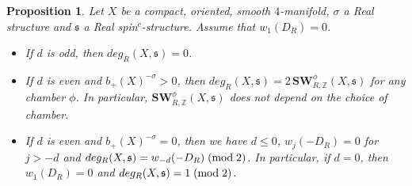\documentclass{amsart}
\newtheorem{proposition}[theorem]{Proposition}
\theoremstyle{definition}
\theoremstyle{remark}
\numberwithin{equation}{section}
\begin{document}
\begin{proposition}\label{prop:deginteger}
Let $X$ be a compact, oriented, smooth $4$-manifold, $\sigma$ a Real structure and $\mathfrak{s}$ a Real spin$^c$-structure. Assume that $w_1(D_R) = 0$.
\begin{itemize}
\item[(1)]{If $d$ is odd, then $deg_R(X,\mathfrak{s}) = 0$.}
\item[(2)]{If $d$ is even and $b_+(X)^{-\sigma}>0$, then $deg_R(X,\mathfrak{s}) = 2 \, \mathbf{SW}^\phi_{R,\mathbb{Z}}(X , \mathfrak{s})$ for any chamber $\phi$. In particular, $\mathbf{SW}^\phi_{R,\mathbb{Z}}(X,\mathfrak{s})$ does not depend on the choice of chamber.}
\item[(3)]{If $d$ is even and $b_+(X)^{-\sigma} = 0$, then we have $d \le 0$, $w_j(-D_R) = 0$ for $j > -d$ and $deg_R(X,\mathfrak{s}) = w_{-d}(-D_R) \; ({\rm mod} \; 2)$. In particular, if $d=0$, then $w_1(D_R) = 0$ and $deg_R(X , \mathfrak{s}) = 1 \; ({\rm mod} \; 2)$.}
\end{itemize}
\end{proposition}
\end{document}
